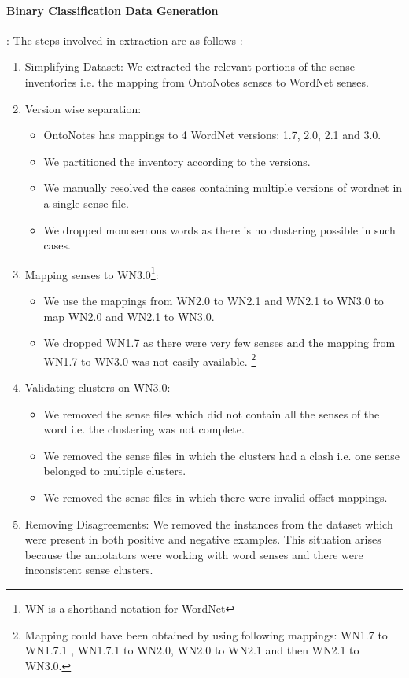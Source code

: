 \paragraph{Binary Classification Data Generation}: The steps involved in extraction are as follows :
\begin{enumerate}
\item Simplifying Dataset: We extracted the relevant portions of the sense inventories i.e. the mapping from OntoNotes senses to WordNet senses.
\item Version wise separation: 
  \begin{itemize}
  \item OntoNotes has mappings to 4 WordNet versions: 1.7, 2.0, 2.1 and 3.0. 
  \item We partitioned the inventory according to the versions. 
  \item We manually resolved the cases containing multiple versions of wordnet in a single sense file.
  \item We dropped monosemous words as there is no clustering possible in such cases.
  \end{itemize}
\item Mapping senses to WN3.0\footnote{WN is a shorthand notation for WordNet}: 
  \begin{itemize}
  \item We use the mappings from WN2.0 to WN2.1 and WN2.1 to WN3.0 to map WN2.0 and WN2.1 to WN3.0. 
  \item We dropped WN1.7 as there were very few senses and the mapping from WN1.7 to WN3.0 was not easily available. \footnote{Mapping could have been obtained by using following mappings: WN1.7 to WN1.7.1 , WN1.7.1 to WN2.0, WN2.0 to WN2.1 and then WN2.1 to WN3.0.}
  \end{itemize}
\item Validating clusters on WN3.0: 
  \begin{itemize}
   \item We removed the sense files which did not contain all the senses of the word i.e. the clustering was not complete.
   \item We removed the sense files in which the clusters had a clash i.e. one sense belonged to multiple clusters.
   \item We removed the sense files in which there were invalid offset mappings.
  \end{itemize}
\item Removing Disagreements: We removed the instances from the dataset which were present in both positive and negative examples. This situation arises because the annotators were working with word senses and there were inconsistent sense clusters.
\end{enumerate}

